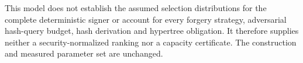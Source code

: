 This model does not establish the assumed selection distributions for the complete deterministic signer or account for every forgery strategy, adversarial hash-query budget, hash derivation and hypertree obligation. It therefore supplies neither a security-normalized ranking nor a capacity certificate. The construction and measured parameter set are unchanged.
